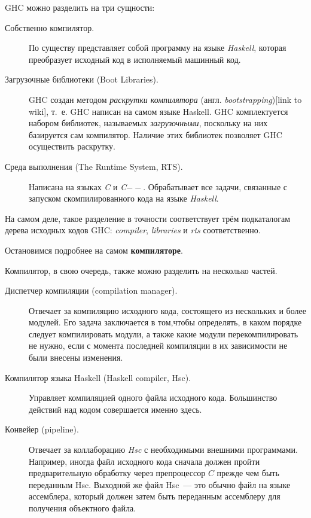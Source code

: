 GHC можно разделить на три сущности:
\begin{description}
\item[Собственно компилятор.] По существу представляет собой программу на языке \textit{Haskell}, которая преобразует исходный код в исполняемый машинный код.
\item[Загрузочные библиотеки (Boot Libraries).] GHC создан методом \textit{раскрутки компилятора} (англ. \textit{bootstrapping})[link to wiki], т.~е. GHC написан на самом языке Haskell. GHC комплектуется набором библиотек, называемых \textit{загрузочными}, поскольку на них базируется сам компилятор. Наличие этих библиотек позволяет GHC осуществить раскрутку.
\item[Среда выполнения (The Runtime System, RTS).] Написана на языках \textit{C} и \textit{C$--$}. Обрабатывает все задачи, связанные с запуском скомпилированного кода на языке \textit{Haskell}.
\end{description}
На самом деле, такое разделение в точности соответствует трём подкаталогам дерева исходных кодов GHC: \textit{compiler}, \textit{libraries} и \textit{rts} соответственно.

Остановимся подробнее на самом \textbf{компиляторе}.

Компилятор, в свою очередь, также можно разделить на несколько частей.
\begin{description}
\item[Диспетчер компиляции (compilation manager).] Отвечает за компиляцию исходного кода, состоящего из нескольких и более модулей. Его задача заключается в том,чтобы определять, в каком порядке следует компилировать модули, а также какие модули перекомпилировать не нужно, если с момента последней компиляции в их зависимости не были внесены изменения.
\item[Компилятор языка Haskell (Haskell compiler, Hsc).] Управляет компиляцией одного файла исходного кода. Большинство действий над кодом совершается именно здесь.
\item[Конвейер (pipeline).] Отвечает за коллаборацию \textit{Hsc} с необходимыми внешними программами. Например, иногда файл исходного кода сначала должен пройти предварительную обработку через препроцессор $C$ прежде чем быть переданным Hsc. Выходной же файл Hsc~--- это обычно файл на языке ассемблера, который должен затем быть переданным ассемблеру для получения объектного файла.
\end{description}



